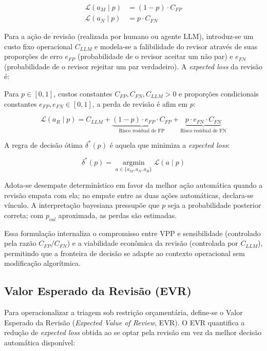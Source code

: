 \[
\begin{aligned}
\mathcal{L}(a_M \mid p) &= (1-p) \cdot C_{FP} \\
\mathcal{L}(a_N \mid p) &= p \cdot C_{FN}
\end{aligned}
\]

Para a ação de revisão (realizada por humano ou agente LLM), introduz-se um custo fixo operacional $C_{LLM}$ e modela-se a falibilidade do revisor através de suas proporções de erro $e_{FP}$ (probabilidade de o revisor aceitar um não par) e $e_{FN}$ (probabilidade de o revisor rejeitar um par verdadeiro). A \textit{expected loss} da revisão é:

\begin{proposition}
\label{prop:review-loss-affine}
{\sloppy
Para $p\in[0,1]$, custos constantes $C_{FP},C_{FN},C_{LLM}>0$ e proporções condicionais constantes $e_{FP},e_{FN}\in[0,1]$, a perda de revisão é afim em $p$:\par}
\[
\mathcal{L}(a_R \mid p) = C_{LLM} + \underbrace{(1-p) \cdot e_{FP} \cdot C_{FP}}_{\text{Risco residual de FP}} + \underbrace{p \cdot e_{FN} \cdot C_{FN}}_{\text{Risco residual de FN}}
\]
\end{proposition}

A regra de decisão ótima $\delta^*(p)$ é aquela que minimiza a \textit{expected loss}:

\[
\delta^*(p) = \underset{a \in \{a_M, a_N, a_R\}}{\operatorname{argmin}} \mathcal{L}(a\mid p)
\]

Adota-se desempate determinístico em favor da melhor ação automática quando a revisão empata com ela; no empate entre as duas ações automáticas, declara-se vínculo. A interpretação bayesiana pressupõe que $p$ seja a probabilidade posterior correta; com $p_{cal}$ aproximada, as perdas são estimadas.

Essa formulação internaliza o compromisso entre VPP e sensibilidade (controlado pela razão $C_{FP}/C_{FN}$) e a viabilidade econômica da revisão (controlada por $C_{LLM}$), permitindo que a fronteira de decisão se adapte ao contexto operacional sem modificação algorítmica.

\subsection{Valor Esperado da Revisão (EVR)}

Para operacionalizar a triagem sob restrição orçamentária, define-se o Valor Esperado da Revisão (\textit{Expected Value of Review}, EVR). O EVR quantifica a redução de \textit{expected loss} obtida ao se optar pela revisão em vez da melhor decisão automática disponível:

